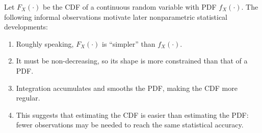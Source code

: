 \documentclass[a4paper,12pt,oneside]{report}
\begin{document}
Let $F_X(\cdot)$ be the CDF of a continuous random variable with PDF
$f_X(\cdot)$. The following informal observations motivate later
nonparametric statistical developments:
\begin{enumerate}
  \item Roughly speaking, $F_X(\cdot)$ is ``simpler'' than $f_X(\cdot)$.
  \item It must be non-decreasing, so its shape is more constrained
    than that of a PDF.
  \item Integration accumulates and smooths the PDF, making the CDF
    more regular.
  \item This suggests that estimating the CDF is easier than estimating
    the PDF: fewer observations may be needed to reach the same
    statistical accuracy.
\end{enumerate}
\end{document}
